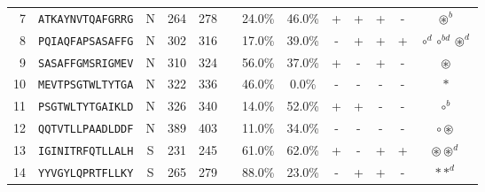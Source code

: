 \begin{tabular}{rcccccccccccc}
7  &  \texttt{ATKAYNVTQAFGRRG} &       N &    264 &   278 &                &                          24.0\% &                           46.0\% &          + &           + &          + &           - &                                                                                     $ \circledast^b $ \\
8  &  \texttt{PQIAQFAPSASAFFG} &       N &    302 &   316 &                &                          17.0\% &                           39.0\% &          - &           + &          + &           + &                                                                  $ \circ^d \circ^{bd} \circledast^d $ \\
9  &  \texttt{SASAFFGMSRIGMEV} &       N &    310 &   324 &                &                          56.0\% &                           37.0\% &          + &           - &          + &           - &                                                                                       $ \circledast $ \\
10 &  \texttt{MEVTPSGTWLTYTGA} &       N &    322 &   336 &                &                          46.0\% &                            0.0\% &          - &           - &          - &           - &                                                                                              $ \ast $ \\
11 &  \texttt{PSGTWLTYTGAIKLD} &       N &    326 &   340 &                &                          14.0\% &                           52.0\% &          + &           + &          - &           - &                                                                                           $ \circ^b $ \\
12 &  \texttt{QQTVTLLPAADLDDF} &       N &    389 &   403 &                &                          11.0\% &                           34.0\% &          - &           - &          - &           - &                                                                                 $ \circ \circledast $ \\
13 &  \texttt{IGINITRFQTLLALH} &       S &    231 &   245 &                &                          61.0\% &                           62.0\% &          + &           - &          + &           + &                                                                         $ \circledast \circledast^d $ \\
14 &  \texttt{YYVGYLQPRTFLLKY} &       S &    265 &   279 &                &                          88.0\% &                           23.0\% &          - &           + &          + &           - &                                                                                       $ \ast \ast^d $ \\

\end{tabular}
